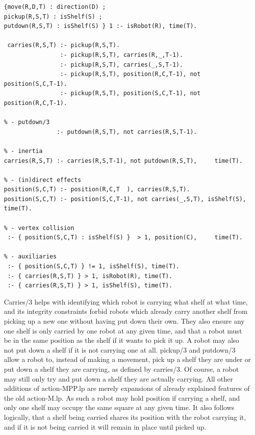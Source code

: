 \documentclass{llncs}
\begin{document}
\begin{lstlisting}[basicstyle=\fontsize{9}{11}\selectfont\ttfamily,frame=single,breaklines=true]
{move(R,D,T) : direction(D) ;
pickup(R,S,T) : isShelf(S) ;
putdown(R,S,T) : isShelf(S) } 1 :- isRobot(R), time(T).

 carries(R,S,T) :- pickup(R,S,T).
                :- pickup(R,S,T), carries(R,_,T-1).
                :- pickup(R,S,T), carries(_,S,T-1).
                :- pickup(R,S,T), position(R,C,T-1), not position(S,C,T-1).
                :- pickup(R,S,T), position(S,C,T-1), not position(R,C,T-1).

% - putdown/3
               :- putdown(R,S,T), not carries(R,S,T-1).

% - inertia
carries(R,S,T) :- carries(R,S,T-1), not putdown(R,S,T),	    time(T).

% - (in)direct effects
position(S,C,T) :- position(R,C,T  ), carries(R,S,T).
position(S,C,T) :- position(S,C,T-1), not carries(_,S,T), isShelf(S), time(T).

% - vertex collision 
 :- { position(S,C,T) : isShelf(S) }  > 1, position(C),	    time(T).

% - auxiliaries 
 :- { position(S,C,T) } != 1, isShelf(S), time(T).
 :- { carries(R,S,T) } > 1, isRobot(R), time(T).
 :- { carries(R,S,T) } > 1, isShelf(S), time(T).
\end{lstlisting}
Carries/3 helps with identifying which robot is carrying what shelf at what time, and its integrity constraints forbid robots which already carry another shelf from picking up a new one without having put down their own. They also ensure any one shelf is only carried by one robot at any given time, and that a robot must be in the same position as the shelf if it wants to pick it up. A robot may also not put down a shelf if it is not carrying one at all.
\newline
pickup/3 and putdown/3 allow a robot to, instead of making a movement, pick up a shelf they are under or put down a shelf they are carrying, as defined by carries/3. Of course, a robot may still only try and put down a shelf they are actually carrying.\newline
All other additions of action-MPP.lp are merely expansions of already explained features of the old action-M.lp. As such a robot may hold position if carrying a shelf, and only one shelf may occupy the same square at any given time. It also follows logically, that a shelf being carried shares its position with the robot carrying it, and if it is not being carried it will remain in place until picked up.\newline
\end{document}
